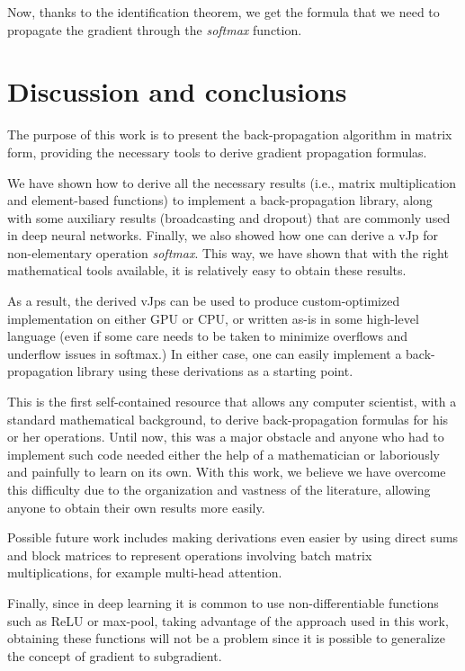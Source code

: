 \documentclass[pdflatex,sn-mathphys-num]{sn-jnl}%
\theoremstyle{thmstyleone}%
\theoremstyle{thmstyletwo}%
\theoremstyle{thmstylethree}%
\begin{document}
Now, thanks to the identification theorem, we get the formula that we need to
propagate the gradient through the \emph{softmax} function.

\section{Discussion and conclusions}\label{sec:conclusion}

The purpose of this work is to present the back-propagation algorithm in matrix
form, providing the necessary tools to derive gradient propagation formulas.

We have shown how to derive all the necessary results (i.e., matrix
multiplication and element-based functions) to implement a back-propagation
library, along with some auxiliary results (broadcasting and dropout) that are
commonly used in deep neural networks.  Finally, we also showed how one can
derive a vJp for non-elementary operation \emph{softmax}.  This way, we have
shown that with the right mathematical tools available, it is relatively easy to
obtain these results.

As a result, the derived vJps can be used to produce custom-optimized
implementation on either GPU or CPU, or written as-is in some high-level
language (even if some care needs to be taken to minimize overflows and
underflow issues in softmax.) In either case, one can easily implement a
back-propagation library using these derivations as a starting point.

This is the first self-contained resource that allows any computer scientist,
with a standard mathematical background, to derive back-propagation formulas for
his or her operations. Until now, this was a major obstacle and anyone who had
to implement such code needed either the help of a mathematician or laboriously
and painfully to learn on its own.  With this work, we believe we have overcome
this difficulty due to the organization and vastness of the literature, allowing
anyone to obtain their own results more easily.

Possible future work includes making derivations even easier by using direct
sums and block matrices to represent operations involving batch matrix
multiplications, for example multi-head attention.

Finally, since in deep learning it is common to use non-differentiable functions
such as ReLU or max-pool, taking advantage of the approach used in this work,
obtaining these functions will not be a problem since it is possible to
generalize the concept of gradient to subgradient.

\begingroup
\iffalse
\let\oldbibliography\thebibliography
\renewcommand{\thebibliography}[1]{%
  \oldbibliography{#1}%
  \setlength{\itemsep}{0pt}%
}
\fi

\endgroup
\end{document}
